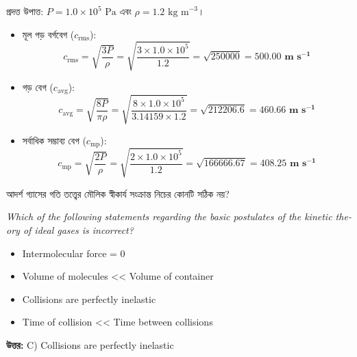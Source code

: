 \documentclass[12pt, a4paper]{article}
\begin{document}
\begin{tcolorbox}[solutionbox={সমাধান (Solution)}]
    \noindent
    প্রদত্ত উপাত্ত: $P = 1.0 \times 10^5\text{ Pa}$ এবং $\rho = 1.2\text{ kg m}^{-3}$।
    \begin{itemize}[leftmargin=1.5em, itemsep=0.2em]
        \item মূল গড় বর্গবেগ ($c_{\text{rms}}$):
        \[ c_{\text{rms}} = \sqrt{\frac{3 P}{\rho}} = \sqrt{\frac{3 \times 1.0 \times 10^5}{1.2}} = \sqrt{250000} = \mathbf{500.00\text{ m s}^{-1}} \]
        \item গড় বেগ ($c_{\text{avg}}$):
        \[ c_{\text{avg}} = \sqrt{\frac{8 P}{\pi \rho}} = \sqrt{\frac{8 \times 1.0 \times 10^5}{3.14159 \times 1.2}} = \sqrt{212206.6} = \mathbf{460.66\text{ m s}^{-1}} \]
        \item সর্বাধিক সম্ভাব্য বেগ ($c_{\text{mp}}$):
        \[ c_{\text{mp}} = \sqrt{\frac{2 P}{\rho}} = \sqrt{\frac{2 \times 1.0 \times 10^5}{1.2}} = \sqrt{166666.67} = \mathbf{408.25\text{ m s}^{-1}} \]
    \end{itemize}
\end{tcolorbox}

\begin{tcolorbox}[questionbox={প্রশ্ন (Question) 16}]
    \noindent
    আদর্শ গ্যাসের গতি তত্ত্বের মৌলিক স্বীকার্য সংক্রান্ত নিচের কোনটি সঠিক নয়?
    
    \vspace{0.8em}
    \begin{english}
    \noindent\textit{\color{darkgray}
    Which of the following statements regarding the basic postulates of the kinetic theory of ideal gases is incorrect?
    }
    \end{english}
\end{tcolorbox}

\begin{itemize}[label={}, leftmargin=1cm, itemsep=0.5em]
    \item[\textbf{A)}] Intermolecular force = 0
    \item[\textbf{B)}] Volume of molecules << Volume of container
    \item[\textbf{C)}] Collisions are perfectly inelastic
    \item[\textbf{D)}] Time of collision << Time between collisions
\end{itemize}

\vspace{0.5em}
\begin{tcolorbox}[answerbox]
    \textbf{\color{success} উত্তর:} C) Collisions are perfectly inelastic
\end{tcolorbox}
\vspace{1em}
\end{document}
